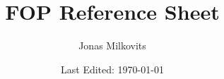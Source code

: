 


\renewcommand{\arraystretch}{1.75} 


\begin{titlepage}
  \title{FOP Reference Sheet} %
  \author{Jonas Milkovits}
  \date{Last Edited: \today}
\end{titlepage}



\maketitle
{} %
\tableofcontents
\clearpage
{} %

\begin{comment}
\section{Stuff that I skipped cuz of chapter 4}

\begin{tabular}{ | p{0.2\textwidth} p{0.75\textwidth} | } 
	\hline
	\makecell[l]{Exceptions aus \\ Lambda-Ausdrücken} &
	\makecell[l]{$\rhd$ Kapitel 5: 47 - 50  } \\ \hline
	
	\makecell[l]{Listen von \\ Lambda-Ausdrücken} & \makecell[l]{$\rhd$ Kapitel 7: 60 - 65 } \\ \hline
	
	\makecell[l]{Methodennamen als \\ Lambda-Ausdrücke} & \makecell[l]{$\rhd$ Kapitel 8: 55 - 84  } \\ \hline

	\makecell[l]{Streams in Racket} & \makecell[l]{$\rhd$ Kapitel 8: 122 - 133  } \\ \hline

	\makecell[l]{ActionListener Lambda} & \makecell[l]{$\rhd$ Kapitel 10: 68-69  } \\ \hline

	\end{tabular}
\end{comment}

